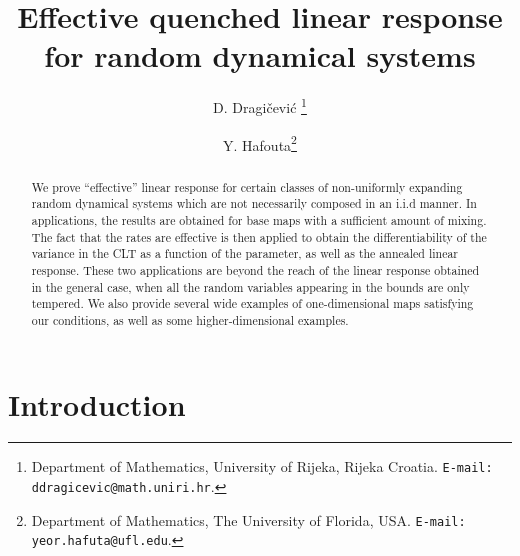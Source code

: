 \documentclass[11pt,reqno,a4paper]{article}
\author{D. Dragi\v cevi\' c \footnote{Department of Mathematics, University of Rijeka, Rijeka Croatia. {\tt E-mail: ddragicevic@math.uniri.hr}.}\and 
	Y. Hafouta\footnote{Department of Mathematics, The University of Florida, USA. {\tt E-mail: yeor.hafuta@ufl.edu}.}}
\theoremstyle{special}
\begin{document}
\title{Effective quenched linear response for random dynamical systems}
\maketitle

\begin{abstract}
We prove ``effective''  linear response for certain classes of non-uniformly expanding random dynamical systems which are not necessarily  composed in an i.i.d manner. In applications, the results are obtained for base maps with a sufficient amount of mixing.
 The fact that the rates are effective is then applied to obtain the differentiability of the variance in the CLT as a function of the parameter, as well as the annealed linear response. These two applications are beyond the reach of the linear response obtained in the general case, when all the random variables appearing in the bounds are only tempered.
We also provide several wide examples of one-dimensional maps satisfying our conditions, as well as some higher-dimensional examples.
\end{abstract}

\section{Introduction}
\end{document}
